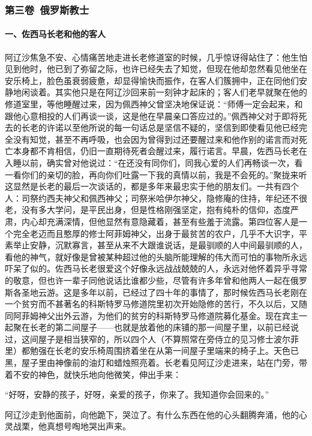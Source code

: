 \subsubsection*{第三卷\ 俄罗斯教士}


\paragraph*{一、佐西马长老和他的客人}
\par 阿辽沙焦急不安、心情痛苦地走进长老修道室的时候，几乎惊讶得站住了：他生怕见到他时，他已到了弥留之际，也许已经失去了知觉，但现在他却忽然看见他坐在安乐椅上，脸色虽衰弱疲惫，却显得愉快而振作，在客人们簇拥中，正在同他们安静地闲谈着。其实他只是在阿辽沙回来前一刻钟才起床的；客人们老早就聚在他的修道室里，等他睡醒过来，因为佩西神父曾坚决地保证说：“师傅一定会起来，和跟他心意相投的人们再谈一谈，这是他在早晨亲口答应过的。”佩西神父对于即将死去的长老的许诺以至他所说的每一句话总是坚信不疑的，坚信到即使看见他已经完全没有知觉，甚至不再呼吸，也会因为曾得到过还要醒过来和他作别的诺言而对死亡本身都不肯相信，仍旧一直期待死者会醒过来，履行诺言。早晨，佐西马长老在入睡以前，确实曾对他说过：“在还没有同你们，同我心爱的人们再畅谈一次，看一看你们的亲切的脸，再向你们吐露一下我的真情以前，我是不会死的。”聚拢来听这显然是长老的最后一次谈话的，都是多年来最忠实于他的朋友们。一共有四个人：司祭约西夫神父和佩西神父；司祭米哈伊尔神父，隐修庵的住持，年纪还不很老，没有多大学问，是平民出身，但是性格刚强坚定，抱有纯朴的信仰，态度严肃，内心却充满深情，但他显然有意隐藏着，甚至有些羞于流露。第四位客人是一个完全老迈而且憨厚的修士阿菲姆神父，出身于最贫苦的农户，几乎不大识字，平素举止安静，沉默寡言，甚至从来不大跟谁说话，是最驯顺的人中间最驯顺的人，看他的神气，就好像是曾被某种超过他的头脑所能理解的伟大而可怕的事物所永远吓呆了似的。佐西马长老很爱这个好像永远战战兢兢的人，永远对他怀着异乎寻常的敬意，但也许一辈子同他说话比谁都少些，尽管有许多年曾和他两人一起在俄罗斯各圣地云游。这是多年以前，已经过了四十年的事情了，那时候佐西马长老刚在一个贫穷而不甚著名的科斯特罗马修道院里初次开始隐修的苦行，不久以后，又随同阿菲姆神父出外云游，为他们的贫穷的科斯特罗马修道院募化基金。现在宾主一起聚在长老的第二间屋子——也就是放着他的床铺的那一间屋子里，以前已经说过，这间屋子是相当狭窄的，所以四个人（不算照常在旁侍立的见习修士波尔菲里）都勉强在长老的安乐椅周围挤着坐在从第一间屋子里端来的椅子上。天色已黑，屋子里由神像前的油灯和蜡烛照亮着。长老看见阿辽沙走进来，站在门旁，带着不安的神色，就快乐地向他微笑，伸出手来：
\par “好呀，安静的孩子，好呀，亲爱的孩子，你来了。我知道你会回来的。”
\par 阿辽沙走到他面前，向他跪下，哭泣了。有什么东西在他的心头翻腾奔涌，他的心灵战栗，他真想号啕地哭出声来。

